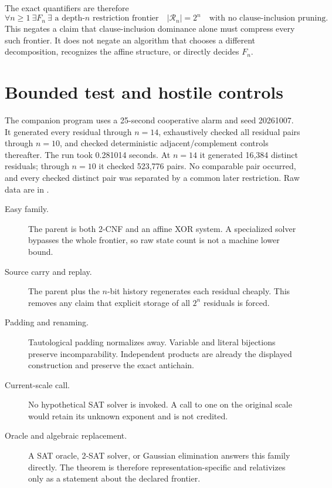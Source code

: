 \documentclass[11pt]{article}
\begin{document}
The exact quantifiers are therefore
\[
 \forall n\ge1\ \exists F_n\ \exists\text{ a depth-$n$ restriction frontier}
 \quad |\mathcal R_n|=2^n
 \quad\text{with no clause-inclusion pruning.}
\]
This negates a claim that clause-inclusion dominance alone must compress every
such frontier.  It does not negate an algorithm that chooses a different
decomposition, recognizes the affine structure, or directly decides $F_n$.

\section{Bounded test and hostile controls}
The companion program
 uses a
25-second cooperative alarm and seed 20261007.  It generated every residual
through $n=14$, exhaustively checked all residual pairs through $n=10$, and
checked deterministic adjacent/complement controls thereafter.  The run took
0.281014 seconds.  At $n=14$ it generated 16,384 distinct residuals; through
$n=10$ it checked 523,776 pairs.  No comparable pair occurred, and every
checked distinct pair was separated by a common later restriction.  Raw data
are in
.

\begin{description}
\item[Easy family.] The parent is both 2-CNF and an affine XOR system.  A
specialized solver bypasses the whole frontier, so raw state count is not a
machine lower bound.
\item[Source carry and replay.] The parent plus the $n$-bit history regenerates
each residual cheaply.  This removes any claim that explicit storage of all
$2^n$ residuals is forced.
\item[Padding and renaming.] Tautological padding normalizes away.  Variable
and literal bijections preserve incomparability.  Independent products are
already the displayed construction and preserve the exact antichain.
\item[Current-scale call.] No hypothetical SAT solver is invoked.  A call to
one on the original scale would retain its unknown exponent and is not
credited.
\item[Oracle and algebraic replacement.] A SAT oracle, 2-SAT solver, or
Gaussian elimination answers this family directly.  The theorem is therefore
representation-specific and relativizes only as a statement about the
declared frontier.
\end{description}
\end{document}
